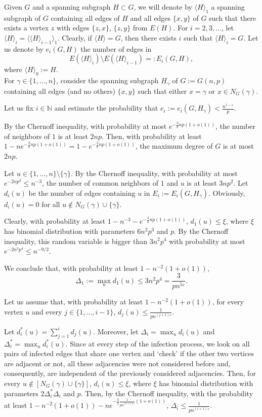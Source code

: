 \documentclass[]{article}
\begin{document}
Given $G$ and a spanning subgraph $H\subset G$, we will denote by $\langle H\rangle_1$ a spanning subgraph of $G$ containing all edges of $H$ and all edges $\{x,y\}$ of $G$ such that there exists a vertex $z$ with edges $\{z,x\}$, $\{z,y\}$ from $E(H)$. For $i=2,3,\ldots$, let $\langle H\rangle_i=\langle\langle H\rangle_{i-1}\rangle_1$. Clearly, if $\langle H\rangle =G$, then there exists $i$ such that $\langle H\rangle_i=G$. Let us denote by $e_i(G,H)$ the number of edges in 
$$
E(\langle H\rangle_i)\setminus E(\langle H\rangle_{i-1})=:E_i(G,H),
$$
where $\langle H\rangle_0:=H$.\\

For $\gamma\in\{1,\ldots,n\}$, consider the spanning subgraph $H_{\gamma}$ of $G:=G(n,p)$ containing all edges (and no others) $\{x,y\}$ such that either $x=\gamma$ or $x\in N_G(\gamma)$. 

Let us fix $i\in\mathbb{N}$ and estimate the probability that $e_i:=e_i(G,H_{\gamma})<\frac{n^{1-\varepsilon}}{p}$.

By the Chernoff inequality, with probability at most $e^{-\frac{3}{8}np(1+o(1))}$, the number of neighbors of $1$ is at least $2np$. Then, with probability at least $1-ne^{-\frac{3}{8}np(1+o(1))}=1-e^{-\frac{3}{8}np(1+o(1))}$, the maximum degree of $G$ is at most $2np$.

Let $u\in\{1,\ldots,n\}\setminus\{\gamma\}$. By the Chernoff inequality, with probability at most $e^{-2np^2}\leq n^{-3}$, the number of common neighbors of $1$ and $u$ is at least $3np^2$. Let $d_i(u)$ be the number of edges containing $u$ in $E_i:=E_i(G,H_{\gamma})$. Obviously, $d_i(u)=0$ for all $u\notin N_G(\gamma)\cup\{\gamma\}$. 

Clearly, with probability at least $1-n^{-3}-e^{-\frac{3}{8}np(1+o(1))}$, $d_1(u)\leq\xi$, where $\xi$ has binomial distribution with parameters $6n^2p^3$ and $p$. By the Chernoff inequality, this random variable is bigger than $3n^2p^4$ with probability at most $e^{-2n^2p^4}\leq n^{-9/2}$. 

We conclude that, with probability at least $1-n^{-2}(1+o(1))$, 
$$
\Delta_1:=\max_u d_1(u)\leq 3n^2p^4=\frac{3}{pn^{5\varepsilon}}.
$$



Let us assume that, with probability at least $1-n^{-2}(1+o(1))$, for every vertex $u$ and every $j\in\{1,\ldots,i-1\}$, $d_j(u)\leq \frac{1}{p n^{(j+1)\varepsilon}}$. 

Let $d^*_i(u)=\sum_{j=1}^i d_j(u)$. Moreover, let $\Delta_i=\max_u d_i(u)$ and $\Delta_i^*=\max_u d_i^*(u)$. Since at every step of the infection process, we look on all pairs of infected edges that share one vertex and `check' if the other two vertices are adjacent or not, all these adjacencies were not considered before and, consequently, are independent of the previously considered adjacencies. Then, for every $u\notin [N_G(\gamma)\cup\{\gamma\}]$,  $d_i(u)\leq\xi$, where $\xi$ has binomial distribution with parameters $2\Delta_i^*\Delta_i$ and $p$. Then, by the Chernoff inequality, with the probability at least $1-n^{-2}(1+o(1))-ne^{-\frac{3}{2}\frac{1}{p n^{(i+1)\varepsilon}}(1+o(1))}$, $\Delta_i\leq\frac{1}{p n^{(i+1)\varepsilon}}$.
\end{document}
